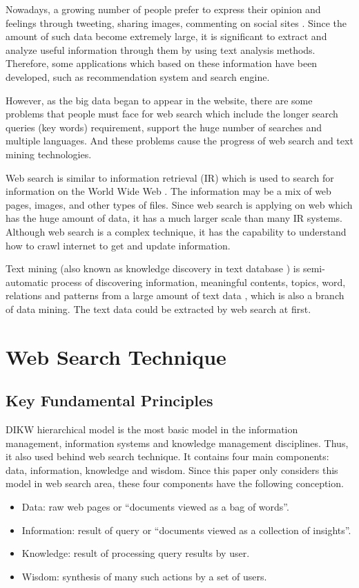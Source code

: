 \documentclass[sigconf]{acmart}
\begin{document}
Nowadays, a growing number of people prefer to express their opinion and feelings through tweeting, sharing images, commenting on social sites \cite{editor01}. Since the amount of such data become extremely large, it is significant to extract and analyze useful information through them by using text analysis methods. Therefore, some applications which based on these information have been developed, such as recommendation system and search engine.

However, as the big data began to appear in the website, there are some problems that people must face for web search which include the longer search queries (key words) requirement, support the huge number of searches and multiple languages. And these problems cause the progress of web search and text mining technologies.

Web search is similar to information retrieval (IR) which is used to search for information on the World Wide Web \cite{editor05}. The information may be a mix of web pages, images, and other types of files. Since web search is applying on web which has the huge amount of data, it has a much larger scale than many IR systems. Although web search is a complex technique, it has the capability to understand how to crawl internet to get and update information.

Text mining (also known as knowledge discovery in text database \cite{editor04}) is semi-automatic process of discovering information, meaningful contents, topics, word, relations and patterns from a large amount of text data \cite{editor01}, which is also a branch of data mining. The text data could be extracted by web search at first.

\section{Web Search Technique}

\subsection{Key Fundamental Principles}
DIKW hierarchical model is the most basic model in the information management, information systems and knowledge management disciplines. Thus, it also used behind web search technique. It contains four main components: data, information, knowledge and wisdom. Since this paper only considers this model in web search area, these four components have the following conception.
\begin{itemize}
\item Data: raw web pages or ``documents viewed as a bag of words''.
\item Information: result of query or ``documents viewed as a collection of insights''.
\item Knowledge: result of processing query results by user.
\item Wisdom: synthesis of many such actions by a set of users.
\end{itemize}
\end{document}

